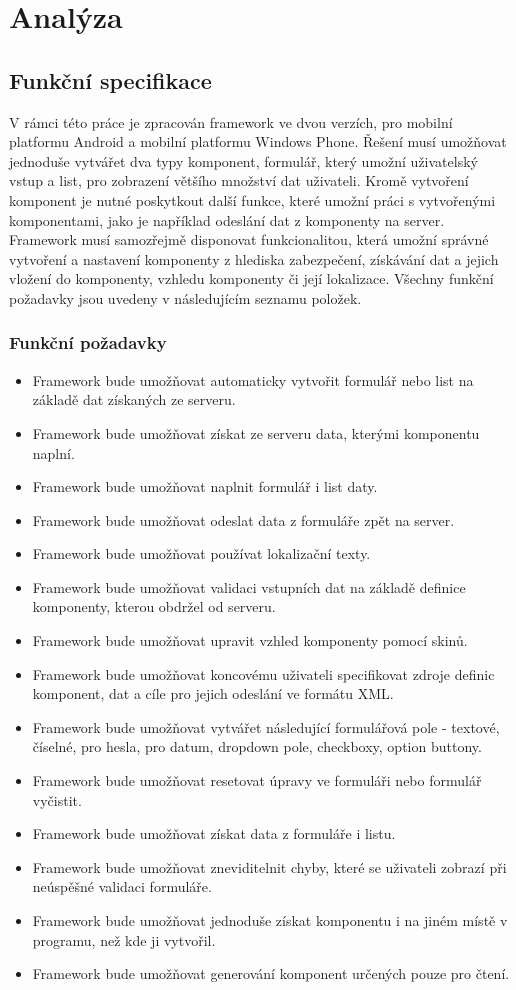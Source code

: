 \chapter{Analýza}
\section{Funkční specifikace}
V rámci této práce je zpracován framework ve dvou verzích, pro mobilní platformu Android a mobilní platformu Windows Phone. Řešení musí umožňovat jednoduše vytvářet dva typy komponent, formulář, který umožní uživatelský vstup a list, pro zobrazení většího množství dat uživateli. Kromě vytvoření komponent je nutné poskytkout další funkce, které umožní práci s vytvořenými komponentami, jako je například odeslání dat z komponenty na server. Framework musí samozřejmě disponovat funkcionalitou, která umožní správné vytvoření a nastavení komponenty z hlediska zabezpečení, získávání dat a jejich vložení do komponenty, vzhledu komponenty či její lokalizace. Všechny funkční požadavky jsou uvedeny v následujícím seznamu položek.
\subsection{Funkční požadavky}
\begin{itemize}
\item Framework bude umožňovat automaticky vytvořit formulář nebo list na základě dat získaných ze serveru.
\item Framework bude umožňovat získat ze serveru data, kterými komponentu naplní.
\item Framework bude umožňovat naplnit formulář i list daty.
\item Framework bude umožňovat odeslat data z formuláře zpět na server.
\item Framework bude umožňovat používat lokalizační texty.
\item Framework bude umožňovat validaci vstupních dat na základě definice komponenty, kterou obdržel od serveru.
\item Framework bude umožňovat upravit vzhled komponenty pomocí skinů.
\item Framework bude umožňovat koncovému uživateli specifikovat zdroje definic komponent, dat a cíle pro jejich odeslání ve formátu XML.
\item Framework bude umožňovat vytvářet následující formulářová pole - textové, číselné, pro hesla, pro datum, dropdown pole, checkboxy, option buttony.
\item Framework bude umožňovat resetovat úpravy ve formuláři nebo formulář vyčistit.
\item Framework bude umožňovat získat data z formuláře i listu.
\item Framework bude umožňovat zneviditelnit chyby, které se uživateli zobrazí při neúspěšné validaci formuláře.
\item Framework bude umožňovat jednoduše získat komponentu i na jiném místě v programu, než kde ji vytvořil.
\item Framework bude umožňovat generování komponent určených pouze pro čtení. 
\end{itemize}

